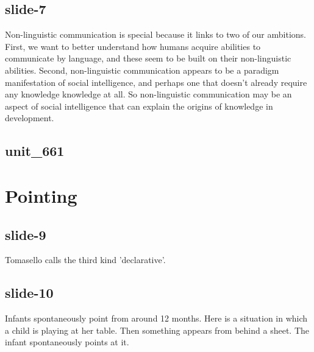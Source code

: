 \documentclass[12pt,\papersize]{extarticle}
\begin{document}
 
\subsection{slide-7}
Non-linguistic communication is special because it links to two of our ambitions. First, we want to better understand how humans acquire abilities to communicate by language, and these seem to be built on their non-linguistic abilities. Second, non-linguistic communication appears to be a paradigm manifestation of social intelligence, and perhaps one that doesn't already require any knowledge knowledge at all. So non-linguistic communication may be an aspect of social intelligence that can explain the origins of knowledge in development.
 
 
\subsection{unit\_661}
 
\section{Pointing}
 
 
\subsection{slide-9}
Tomasello calls the third kind 'declarative'.
 
 
\subsection{slide-10}
Infants spontaneously point from around 12 months.
Here is a situation in which a child is playing at her table. Then something appears from behind a sheet. The infant spontaneously points at it.
 
 
\end{document}

